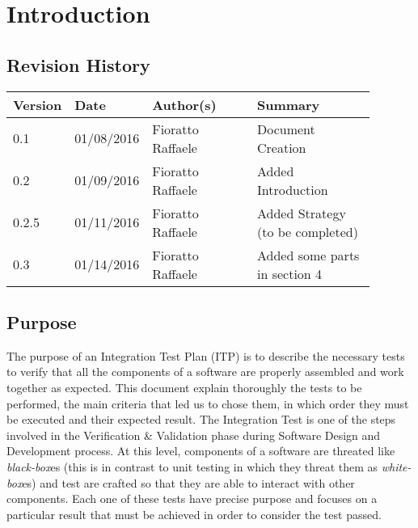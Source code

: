 \newpage
\section{Introduction}
\subsection{Revision History}
\begin{table}[H]
	\centering
	\begin{tabular*}{\linewidth}{|p{0.1\linewidth}|p{0.13\linewidth}|p{0.3099\linewidth}|p{0.3499\linewidth}|}
		\hline
		\textbf{Version} & \textbf{Date}       & \textbf{Author(s)}         & \textbf{Summary}           \\ \hline
		0.1     & 01/08/2016 & Fioratto Raffaele & Document Creation \\ \hline
		0.2		& 01/09/2016 & Fioratto Raffaele & Added Introduction \\ \hline
		0.2.5	& 01/11/2016 & Fioratto Raffaele & Added Strategy (to be completed) \\ \hline 
		0.3		& 01/14/2016 & Fioratto Raffaele & Added some parts in section 4 \\ \hline
	\end{tabular*}
\end{table}
\break
\subsection{Purpose}
The purpose of an Integration Test Plan (ITP) is to describe the necessary tests to verify that all the components of a software are properly assembled and work together as expected. This document explain thoroughly the tests to be performed, the main criteria that led us to chose them, in which order they must be executed and their expected result. The Integration Test is one of the steps involved in the Verification \& Validation phase during Software Design and Development process. At this level, components of a software are threated like \textit{black-box}es (this is in contrast to unit testing in which they threat them as \textit{white-box}es) and test are crafted so that they are able to interact with other components. Each one of these tests have precise purpose and focuses on a particular result that must be achieved in order to consider the test passed.
